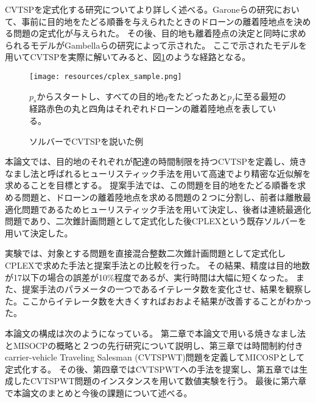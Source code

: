 \documentclass[11pt,a4paper,dvipdfmx,titlepage,uplatex]{jsarticle}
\theoremstyle{mystyle}
\newcommand{\0}{\mathbf{0}}
\begin{document}
	CVTSPを定式化する研究についてより詳しく述べる。Garoneらの研究において、事前に目的地をたどる順番を与えられたときのドローンの離着陸地点を決める問題の定式化が与えられた。\cite{garone2010planning}
	その後、目的地も離着陸点の決定と同時に求められるモデルがGambellaらの研究によって示された。\cite{gambella2018exact}
	ここで示されたモデルを用いてCVTSPを実際に解いてみると、図\ref{fig:example_CPLEX}のような経路となる。
	\begin{figure}[htbp]
		\centering
		\texttt{[image: resources/cplex\_sample.png]}
		\caption{ソルバーでCVTSPを説いた例}
		\begin{minipage}[c]{0.7\hsize}
			$p_s$からスタートし、すべての目的地$q$をたどったあと$p_f$に至る最短の経路赤色の丸と四角はそれぞれドローンの離着陸地点を表している。
		\end{minipage}
		\label{fig:example_CPLEX}
	\end{figure}
	
	
	本論文では、目的地のそれぞれが配達の時間制限を持つCVTSPを定義し、焼きなまし法と呼ばれるヒューリスティック手法を用いて高速でより精密な近似解を求めることを目標とする。
	提案手法では、この問題を目的地をたどる順番を求める問題と、ドローンの離着陸地点を求める問題の２つに分割し、前者は離散最適化問題であるためヒューリスティック手法を用いて決定し、後者は連続最適化問題であり、二次錐計画問題として定式化した後CPLEXという既存ソルバーを用いて決定した。
	
	実験では、対象とする問題を直接混合整数二次錐計画問題として定式化しCPLEXで求めた手法と提案手法との比較を行った。
	その結果、精度は目的地数が17以下の場合の誤差が10\%程度であるが、実行時間は大幅に短くなった。
	また、提案手法のパラメータの一つであるイテレータ数を変化させ、結果を観察した。ここからイテレータ数を大きくすればおおよそ結果が改善することがわかった。
	
	本論文の構成は次のようになっている。
	第二章で本論文で用いる焼きなまし法とMISOCPの概略と２つの先行研究について説明し、第三章では時間制約付きcarrier-vehicle Traveling Salesman (CVTSPWT)問題を定義してMICOSPとして定式化する。
	その後、第四章ではCVTSPWTへの手法を提案し、第五章では生成したCVTSPWT問題のインスタンスを用いて数値実験を行う。
	最後に第六章で本論文のまとめと今後の課題について述べる。
	
\end{document}
